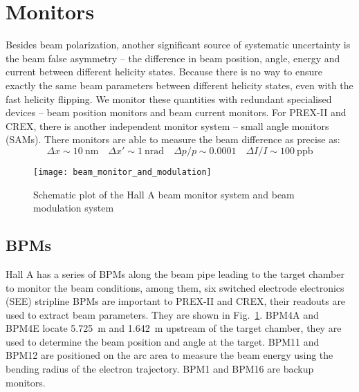 \section{Monitors}
Besides beam polarization, another significant source of systematic uncertainty
is the beam false asymmetry -- the difference in beam position, angle, energy and
current between different helicity states. Because there is no way to ensure
exactly the same beam parameters between different helicity states, even with the fast
helicity flipping. We monitor these quantities with redundant specialised devices
-- beam position monitors and beam current monitors. For PREX-II
and CREX, there is another independent monitor system -- small angle monitors (SAMs).
There monitors are able to measure the beam difference as precise as:
$$ \Delta x \sim 10\ \mathrm{nm} \quad \Delta x' \sim 1\ \mathrm{nrad} \quad \Delta p/p \sim 0.0001 \quad \Delta I/I \sim 100 \ \mathrm{ppb} $$
\begin{figure}[!h]
    \centering
    \texttt{[image: beam\_monitor\_and\_modulation]}
    \caption{Schematic plot of the Hall A beam monitor system and beam modulation system}
    \label{fig:hall_a_monitors_and_modulation}
\end{figure}

\begin{comment}
    \begin{itemize}
	\item beam correlations
	\item monitor precision (resolution): double difference width
	\item noise
	\item pedestal: calibration
	\item cross-correlation
    \end{itemize}
\end{comment}

\subsection{BPMs}
Hall A has a series of BPMs along the beam pipe leading to the target chamber
to monitor the beam conditions, among them, six switched electrode electronics (SEE) 
stripline BPMs are important to PREX-II and CREX, their readouts are used to 
extract beam parameters. They are shown in Fig.~\ref{fig:hall_a_monitors_and_modulation}. 
BPM4A and BPM4E locate 5.725~m and 1.642~m upstream of the target chamber, 
they are used to determine the beam position and angle at the target. BPM11 and BPM12
are positioned on the arc area to measure the beam energy using the bending 
radius of the electron trajectory. BPM1 and BPM16 are backup monitors.

